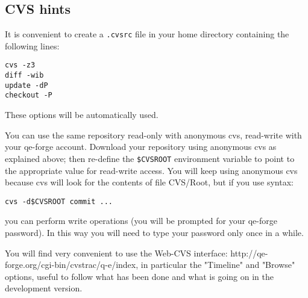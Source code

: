 \documentclass[12pt,a4paper]{article}
\begin{document}
\subsection{CVS hints}

It is convenient to create a \texttt{.cvsrc} file in your
home directory containing the following lines:
\begin{verbatim}
cvs -z3
diff -wib
update -dP
checkout -P
\end{verbatim}
These options will be automatically used.

You can use the same repository read-only with anonymous cvs,
read-write with your qe-forge account. Download your repository 
using anonymous cvs as explained above; then re-define the
\texttt{\$CVSROOT} environment variable to point to the
appropriate value for read-write access. You will keep
using anonymous cvs because cvs will look for the contents of
file CVS/Root, but if you use syntax:
\begin{verbatim}
cvs -d$CVSROOT commit ...
\end{verbatim}
you can perform write operations (you will be prompted for your 
qe-forge password). In this way you will need to type 
your password only once in a while.

You will find very convenient to use the Web-CVS interface:
http://qe-forge.org/cgi-bin/cvstrac/q-e/index, in particular the 
"Timeline" and "Browse" options, useful to follow what
has been done and what is going on in the development version.
\end{document}
